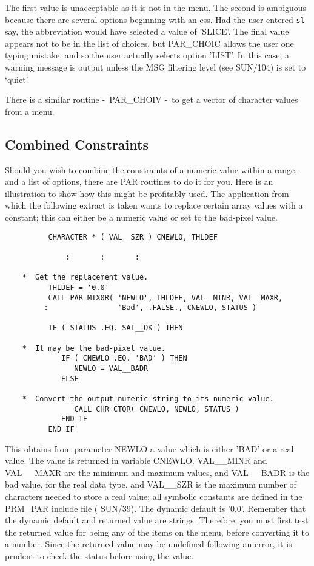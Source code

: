 \documentclass[twoside,11pt]{article}
\newcommand{\xref}[3]{#1}
\newcommand{\xlabel}[1]{}
\newcommand{\latex}[1]{#1}
\newcommand{\dash}{--}
\renewcommand{\dash}{-}
\begin{document}
The first value is unacceptable as it is not in the menu.  The second is
ambiguous because there are several options beginning with an ess. Had
the user entered {\tt sl} say, the abbreviation would have selected a
value of 'SLICE'. The final value appears not to be in the list of
choices, but PAR\_CHOIC allows the user one typing mistake, and so the
user actually selects option 'LIST'. In this case, a warning message is output
unless the
\xref{MSG filtering level}{sun104}{conditional_message_reporting}
\latex{ (see SUN/104)} is set to `quiet'.

There is a similar routine \dash\ PAR\_CHOIV \dash\ to get a vector of character
values from a menu.

\subsection{\xlabel{combined_constraints}Combined Constraints}

Should you wish to combine the constraints of a numeric value within a
range, and a list of options, there are PAR routines to do it for you.
Here is an illustration to show how this might be profitably used.  The
application from which the following extract is taken wants to replace
certain array values with a constant; this can either be a numeric value
or set to the bad-pixel value. 

\begin{verbatim}
          CHARACTER * ( VAL__SZR ) CNEWLO, THLDEF

              :       :       :

    *  Get the replacement value.
          THLDEF = '0.0'
          CALL PAR_MIX0R( 'NEWLO', THLDEF, VAL__MINR, VAL__MAXR,
         :                'Bad', .FALSE., CNEWLO, STATUS )

          IF ( STATUS .EQ. SAI__OK ) THEN

    *  It may be the bad-pixel value.
             IF ( CNEWLO .EQ. 'BAD' ) THEN
                NEWLO = VAL__BADR
             ELSE

    *  Convert the output numeric string to its numeric value.
                CALL CHR_CTOR( CNEWLO, NEWLO, STATUS )
             END IF
          END IF
\end{verbatim}

This obtains from parameter NEWLO a value which is either 'BAD' or a
real value.  The value is returned in variable CNEWLO.  VAL\_\_MINR and
VAL\_\_MAXR are the minimum and maximum values, and VAL\_\_BADR is the
bad value, for the real data type, and VAL\_\_SZR is the maximum number
of characters needed to store a real value; all symbolic constants are
defined in the PRM\_PAR include file (
\xref{SUN/39}{sun39}{}).
 The dynamic default is
'0.0'. Remember that the dynamic default and returned value are
strings.  Therefore, you must first test the returned value for being any
of the items on the menu, before converting it to a number.  Since the
returned value may be undefined following an error, it is prudent to
check the status before using the value. 
\end{document}
